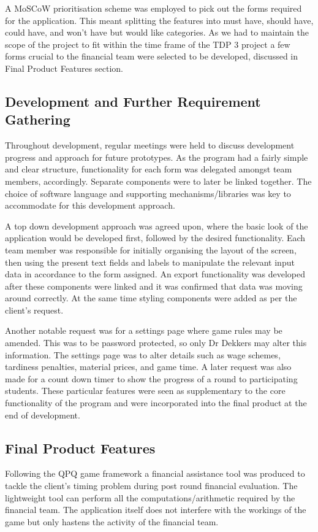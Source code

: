 \documentclass{l3proj}
\begin{document}
A MoSCoW prioritisation scheme was employed to pick out the forms required for the application. This meant splitting the features into must have, should have, could have, and won't have but would like categories. As we had to maintain the scope of the project to fit within the time frame of the TDP 3 project a few forms crucial to the financial team were selected to be developed, discussed in Final Product Features section.

\subsection{Development and Further Requirement Gathering}
Throughout development, regular meetings were held to discuss development progress and approach for future prototypes. As the program had a fairly simple and clear structure, functionality for each form was delegated amongst team members, accordingly. Separate components were to later be linked together. The choice of software language and supporting mechanisms/libraries was key to accommodate for this development approach.

A top down development approach was agreed upon, where the basic look of the application would be developed first, followed by the desired functionality. Each team member was responsible for initially organising the layout of the screen, then using the present text fields and labels to manipulate the relevant input data in accordance to the form assigned. An export functionality was  developed after these components were linked and it was confirmed that data was moving around correctly. At the same time styling components were added as per the client's request.

Another notable request was for a settings page where game rules may be amended. This was to be password protected, so only Dr Dekkers may alter this information. The settings page was to alter details such as wage schemes, tardiness penalties, material prices, and game time. A later request was also made for a count down timer to show the progress of a round to participating students.  These particular features were seen as supplementary to the core functionality of the program  and were incorporated into the final product at the end of development.

\subsection{Final Product Features}
Following the QPQ game framework a financial assistance tool was produced to tackle the client's timing problem during post round financial evaluation. The lightweight tool can perform all the computations/arithmetic required by the financial team. The application itself does not interfere with the workings of the game but only hastens the activity of the financial team.
\end{document}
